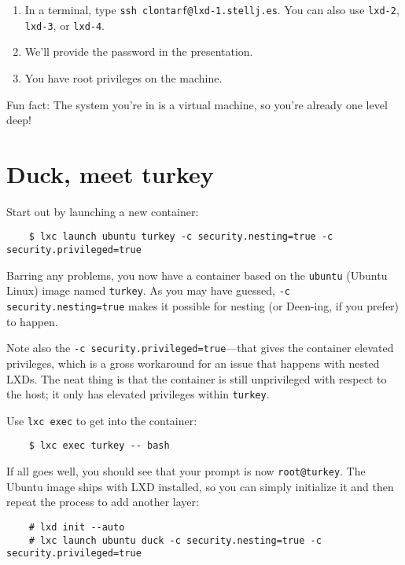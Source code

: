 \begin{enumerate}
  \item In a terminal, type \texttt{ssh clontarf@lxd-1.stellj.es}. You can also use \texttt{lxd-2}, \texttt{lxd-3}, or \texttt{lxd-4}.
  \item We'll provide the password in the presentation.
  \item You have root privileges on the machine.
\end{enumerate}

Fun fact: The system you're in is a virtual machine, so you're already one level deep!

\section*{Duck, meet turkey}

Start out by launching a new container:

\begin{verbatim}
    $ lxc launch ubuntu turkey -c security.nesting=true -c security.privileged=true
\end{verbatim}

Barring any problems, you now have a container based on the \texttt{ubuntu} (Ubuntu Linux) image named \texttt{turkey}. As you may have guessed, \texttt{-c security.nesting=true} makes it possible for nesting (or Deen-ing, if you prefer) to happen.

Note also the \texttt{-c security.privileged=true}---that gives the container elevated privileges, which is a gross workaround for an issue that happens with nested LXDs. The neat thing is that the container is still unprivileged with respect to the host; it only has elevated privileges within \texttt{turkey}.

Use \texttt{lxc exec} to get into the container:

\begin{verbatim}
    $ lxc exec turkey -- bash
\end{verbatim}

If all goes well, you should see that your prompt is now \texttt{root@turkey}. The Ubuntu image ships with LXD installed, so you can simply initialize it and then repeat the process to add another layer:

\begin{verbatim}
    # lxd init --auto
    # lxc launch ubuntu duck -c security.nesting=true -c security.privileged=true
\end{verbatim}

